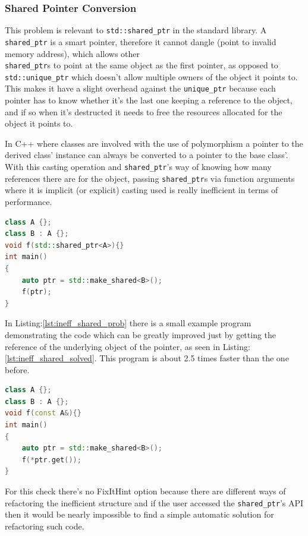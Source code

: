\subsubsection{Shared Pointer Conversion}
\par This problem is relevant to \verb|std::shared_ptr| in the standard library. A \verb|shared_ptr| is a smart pointer, therefore it cannot dangle (point to invalid memory address), which allows other \\\verb|shared_ptr|s to point at the same object as the first pointer, as opposed to \\ \verb|std::unique_ptr| which doesn't allow multiple owners of the object it points to. This makes it have a slight overhead against the \verb|unique_ptr| because each pointer has to know whether it's the last one keeping a reference to the object, and if so when it's destructed it needs to free the resources allocated for the object it points to. \medskip
\par In C++ where classes are involved with the use of polymorphism a pointer to the derived class' instance can always be converted to a pointer to the base class'. With this casting operation and \verb|shared_ptr|'s way of knowing how many references there are for the object, passing \verb|shared_ptr|s via function arguments where it is implicit (or explicit) casting used is really inefficient in terms of performance. \medskip
\begin{lstlisting}[language=c++, frame=single ,caption={Inefficient implicit cast}, label={lst:ineff_shared_prob}]
class A {};
class B : A {};
void f(std::shared_ptr<A>){}
int main()
{
	auto ptr = std::make_shared<B>();
	f(ptr);
}
\end{lstlisting}
\par In Listing:\ref{lst:ineff_shared_prob} there is a small example program demonstrating the code which can be greatly improved just by getting the reference of the underlying object of the pointer, as seen in Listing:\ref{lst:ineff_shared_solved}. This program is about 2.5 times faster than the one before.
\begin{lstlisting}[language=c++, frame=single ,caption={A much faster version}, label={lst:ineff_shared_solved}]
class A {};
class B : A {};
void f(const A&){}
int main()
{
	auto ptr = std::make_shared<B>();
	f(*ptr.get());
}
\end{lstlisting}
\par For this check there's no FixItHint option because there are different ways of refactoring the inefficient structure and if the user accessed the \verb|shared_ptr|'s API then it would be nearly impossible to find a simple automatic solution for refactoring such code.
